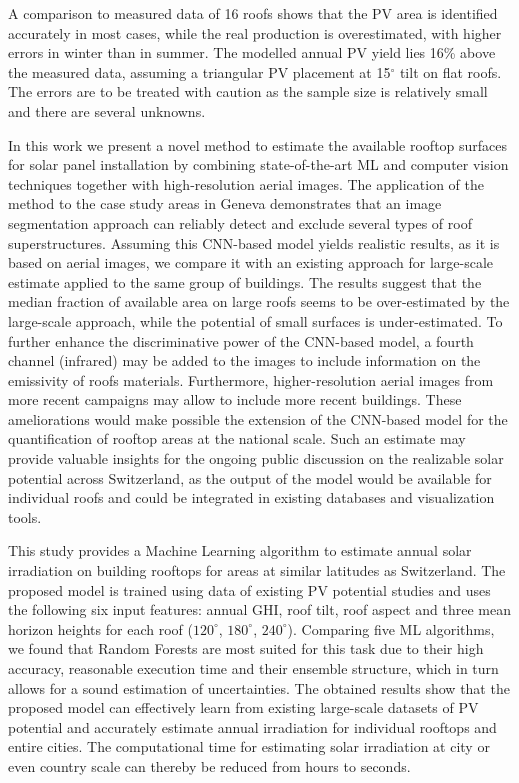 A comparison to measured data of 16 roofs shows that the PV area is identified accurately in most cases, while the real production is overestimated, with higher errors in winter than in summer. The modelled annual PV yield lies 16\% above the measured data, assuming a triangular PV placement at 15$^\circ$ tilt on flat roofs. The errors are to be treated with caution as the sample size is relatively small and there are several unknowns.

In this work we present a novel method to estimate the available rooftop surfaces for solar panel installation by combining state-of-the-art ML and computer vision techniques together with high-resolution aerial images. The application of the method to the case study areas in Geneva demonstrates that an image segmentation approach can reliably detect and exclude several types of roof superstructures. Assuming this CNN-based model yields realistic results, as it is based on aerial images, we compare it with an existing approach for large-scale estimate applied to the same group of buildings. The results suggest that the median fraction of available area on large roofs seems to be over-estimated by the large-scale approach, while the potential of small surfaces is under-estimated. To further enhance the discriminative power of the CNN-based model, a fourth channel (infrared) may be added to the images to include information on the emissivity of roofs materials. Furthermore, higher-resolution aerial images from more recent campaigns may allow to include more recent buildings. These ameliorations would make possible the extension of the CNN-based model for the quantification of rooftop areas at the national scale. Such an estimate may provide valuable insights for the ongoing public discussion on the realizable solar potential across Switzerland, as the output of the model would be available for individual roofs and could be integrated in existing databases and visualization tools.

This study provides a Machine Learning algorithm to estimate annual solar irradiation on building rooftops for areas at similar latitudes as Switzerland. The proposed model is trained using data of existing PV potential studies and uses the following six input features: annual GHI, roof tilt, roof aspect and three mean horizon heights for each roof ($120^\circ$, $180^\circ$, $240^\circ$). Comparing five ML algorithms, we found that Random Forests are most suited for this task due to their high accuracy, reasonable execution time and their ensemble structure, which in turn allows for a sound estimation of uncertainties. The obtained results show that the proposed model can effectively learn from existing large-scale datasets of PV potential and accurately estimate annual irradiation for individual rooftops and entire cities. The computational time for estimating solar irradiation at city or even country scale can thereby be reduced from hours to seconds.

